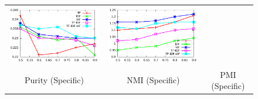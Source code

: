 \documentclass{sig-alternate}
\begin{document}
\begin{figure}[t!]
\begin{center}
{\begin{tabular}{ccc}
		\includegraphics[width=200pt]{Figs/2-2.pdf} & 
		 \includegraphics[width=200pt]{Figs/2-3.pdf} \\
		{ Purity (Specific)} & { NMI (Specific)} & 
		{ PMI (Specific)}\\


\end{tabular}}
\end{center}
\end{figure}
\end{document}
